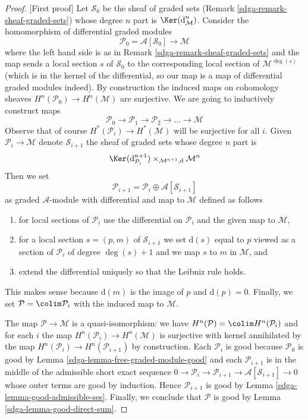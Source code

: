 \begin{proof}
[First proof]
Let $\mathcal{S}_0$ be the sheaf of graded sets
(Remark \ref{sdga-remark-sheaf-graded-sets})
whose degree $n$ part is $\Ker(\text{d}_\mathcal{M}^n)$.
Consider the homomorphism of differential graded modules
$$
\mathcal{P}_0 = \mathcal{A}[\mathcal{S}_0] \longrightarrow \mathcal{M}
$$
where the left hand side is as in Remark \ref{sdga-remark-sheaf-graded-sets}
and the map sends a local section $s$ of $\mathcal{S}_0$
to the corresponding local section of $\mathcal{M}^{\deg(s)}$
(which is in the kernel of the differential, so our map is
a map of differential graded modules indeed). By construction the
induced maps on cohomology sheaves $H^n(\mathcal{P}_0) \to H^n(\mathcal{M})$
are surjective. We are going to inductively construct maps
$$
\mathcal{P}_0 \to \mathcal{P}_1 \to \mathcal{P}_2 \to \ldots \to \mathcal{M}
$$
Observe that of course $H^*(\mathcal{P}_i) \to H^*(\mathcal{M})$
will be surjective for all $i$.
Given $\mathcal{P}_i \to \mathcal{M}$ denote $\mathcal{S}_{i + 1}$
the sheaf of graded sets whose degree $n$ part is
$$
\Ker(\text{d}_{\mathcal{P}_i}^{n + 1})
\times_{\mathcal{M}^{n + 1}, \text{d}}
\mathcal{M}^n
$$
Then we set
$$
\mathcal{P}_{i + 1} = \mathcal{P}_i \oplus \mathcal{A}[\mathcal{S}_{i + 1}]
$$
as graded $\mathcal{A}$-module with differential and map to
$\mathcal{M}$ defined as follows
\begin{enumerate}
\item for local sections of $\mathcal{P}_i$ use the differential on
$\mathcal{P}_i$ and the given map to $\mathcal{M}$,
\item for a local section $s = (p, m)$ of $\mathcal{S}_{i + 1}$ we set
$\text{d}(s)$ equal to $p$ viewed as a section of $\mathcal{P}_i$
of degree $\deg(s) + 1$ and we map $s$ to $m$ in $\mathcal{M}$, and
\item extend the differential uniquely so that the Leibniz rule holds.
\end{enumerate}
This makes sense because $\text{d}(m)$ is the image of $p$ and
$\text{d}(p) = 0$.
Finally, we set $\mathcal{P} = \colim \mathcal{P}_i$ with the
induced map to $\mathcal{M}$.

\medskip\noindent
The map $\mathcal{P} \to \mathcal{M}$ is a quasi-isomorphism:
we have $H^n(\mathcal{P}) = \colim H^n(\mathcal{P}_i)$
and for each $i$ the map $H^n(\mathcal{P}_i) \to H^n(\mathcal{M})$
is surjective with kernel annihilated  by the map
$H^n(\mathcal{P}_i) \to H^n(\mathcal{P}_{i + 1})$ by construction.
Each $\mathcal{P}_i$ is good because $\mathcal{P}_0$ is good
by Lemma \ref{sdga-lemma-free-graded-module-good} and each $\mathcal{P}_{i + 1}$
is in the middle of the admissible short exact sequence
$0 \to \mathcal{P}_i \to \mathcal{P}_{i + 1} \to
\mathcal{A}[\mathcal{S}_{i + 1}] \to 0$
whose outer terms are good by induction. Hence
$\mathcal{P}_{i + 1}$ is good by
Lemma \ref{sdga-lemma-good-admissible-ses}.
Finally, we conclude that $\mathcal{P}$ is good by
Lemma \ref{sdga-lemma-good-direct-sum}.
\end{proof}

